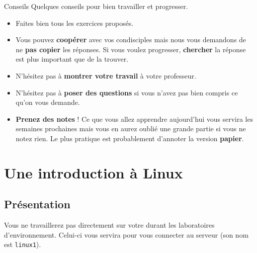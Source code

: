 \documentclass[a4paper,11pt]{style-esi/td}
\begin{document}
\entete
\titre
{}
\lastedit

\bigskip
\tableofcontents

\vfill
\begin{coltbox}{Conseils}
	Quelques conseils pour bien travailler et progresser.
	\begin{itemize}
	\item 
		Faites bien tous les exercices proposés.
	\item 
		Vous pouvez \textbf{coopérer} avec vos condisciples 
		mais nous vous demandons de ne \textbf{pas copier} les réponses. 
		Si vous voulez progresser, \textbf{chercher} la réponse est plus important que de la trouver. 
	\item 
		N'hésitez pas à \textbf{montrer votre travail} à votre professeur.
	\item 
		N'hésitez pas à \textbf{poser des questions} 
		si vous n'avez pas bien compris ce qu'on vous demande.
	\item 
		\textbf{Prenez des notes} ! 
		Ce que vous allez apprendre aujourd'hui 
		vous servira les semaines prochaines 
		mais vous en aurez oublié une grande partie si vous ne notez rien. 
		Le plus pratique est probablement d'annoter la version \textbf{papier}. 
	\end{itemize}
\end{coltbox}
\vfill
	
\newpage
\section{Une introduction à Linux}


	\subsection{Présentation}

		Vous ne travaillerez pas directement sur votre  durant les laboratoires d'environnement. 
		Celui-ci vous servira pour vous connecter au serveur 
		(son nom est \verb_linux1_).
\end{document}
